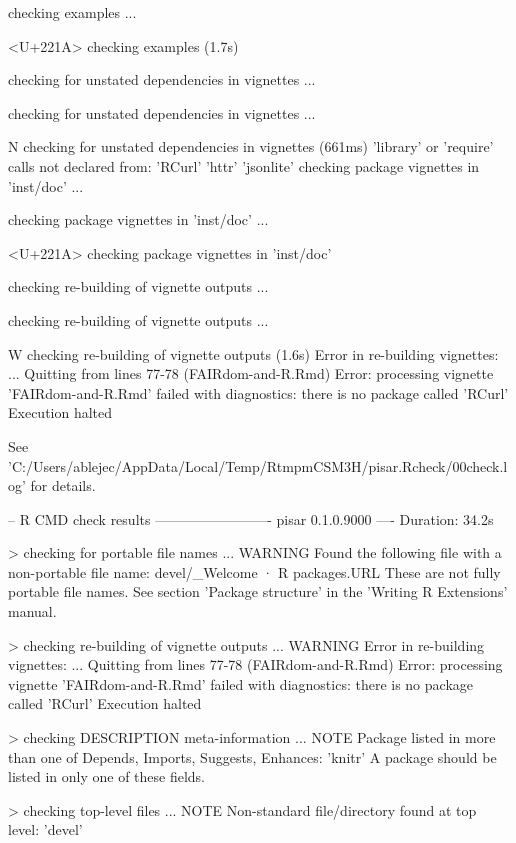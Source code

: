 \documentclass[a4paper,12pt]{article}\usepackage[]{graphicx}\usepackage[]{color}
\begin{document}
\begin{Schunk}
\begin{Soutput}
   checking examples ... 
  
<U+221A>  checking examples (1.7s)

  
  
  
   checking for unstated dependencies in vignettes ...
  
   checking for unstated dependencies in vignettes ... 
  
N  checking for unstated dependencies in vignettes (661ms)
   'library' or 'require' calls not declared from:
     'RCurl' 'httr' 'jsonlite'
   checking package vignettes in 'inst/doc' ...
  
   checking package vignettes in 'inst/doc' ... 
  
<U+221A>  checking package vignettes in 'inst/doc'

  
  
  
   checking re-building of vignette outputs ...
  
   checking re-building of vignette outputs ... 
  
W  checking re-building of vignette outputs (1.6s)
   Error in re-building vignettes:
     ...
   Quitting from lines 77-78 (FAIRdom-and-R.Rmd) 
   Error: processing vignette 'FAIRdom-and-R.Rmd' failed with diagnostics:
   there is no package called 'RCurl'
   Execution halted
   

  
   
   See
     'C:/Users/ablejec/AppData/Local/Temp/RtmpmCSM3H/pisar.Rcheck/00check.log'
   for details.
   
   

-- R CMD check results ------------------------- pisar 0.1.0.9000 ----
Duration: 34.2s

> checking for portable file names ... WARNING
  Found the following file with a non-portable file name:
    devel/_Welcome · R packages.URL
  These are not fully portable file names.
  See section 'Package structure' in the 'Writing R Extensions' manual.

> checking re-building of vignette outputs ... WARNING
  Error in re-building vignettes:
    ...
  Quitting from lines 77-78 (FAIRdom-and-R.Rmd) 
  Error: processing vignette 'FAIRdom-and-R.Rmd' failed with diagnostics:
  there is no package called 'RCurl'
  Execution halted

> checking DESCRIPTION meta-information ... NOTE
  Package listed in more than one of Depends, Imports, Suggests, Enhances:
    'knitr'
  A package should be listed in only one of these fields.

> checking top-level files ... NOTE
  Non-standard file/directory found at top level:
    'devel'


\end{Soutput}
\end{Schunk}
\end{document}
